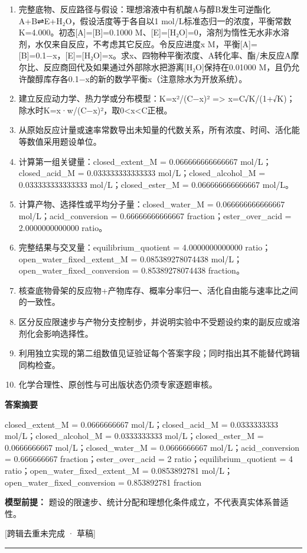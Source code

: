 \documentclass[UTF8,11pt,a4paper]{ctexart}
\begin{document}
\begin{enumerate}
\item 完整底物、反应路径与假设：理想溶液中有机酸A与醇B发生可逆酯化A+B⇌E+H₂O，假设活度等于各自以1 mol/L标准态归一的浓度，平衡常数K=4.000。初态[A]=[B]=0.1000 M、[E]=[H₂O]=0，溶剂为惰性无水非水溶剂，水仅来自反应，不考虑其它反应。令反应进度x M，平衡[A]=[B]=0.1−x，[E]=[H₂O]=x。求x、四物种平衡浓度、A转化率、酯/未反应A摩尔比、反应商回代及如果通过外部除水把游离[H₂O]保持在0.01000 M，且仍允许酸醇库存各0.1−x的新的数学平衡x（注意除水为开放系统）。
\item 建立反应动力学、热力学或分布模型：K=x²/(C−x)² => x=C√K/(1+√K)；除水时K=x·w/(C−x)²，取0<x<C正根。
\item 从原始反应计量或速率常数导出未知量的代数关系，所有浓度、时间、活化能等数值采用题设单位。
\item 计算第一组关键量：closed\_extent\_M = 0.066666666666667 mol/L；closed\_acid\_M = 0.033333333333333 mol/L；closed\_alcohol\_M = 0.033333333333333 mol/L；closed\_ester\_M = 0.066666666666667 mol/L。
\item 计算产物、选择性或平均分子量：closed\_water\_M = 0.066666666666667 mol/L；acid\_conversion = 0.66666666666667 fraction；ester\_over\_acid = 2.0000000000000 ratio。
\item 完整结果与交叉量：equilibrium\_quotient = 4.0000000000000 ratio；open\_water\_fixed\_extent\_M = 0.085389278074438 mol/L；open\_water\_fixed\_conversion = 0.85389278074438 fraction。
\item 核查底物骨架的反应物+产物库存、概率分率归一、活化自由能与速率比之间的一致性。
\item 区分反应限速步与产物分支控制步，并说明实验中不受题设约束的副反应或溶剂化会影响选择性。
\item 利用独立实现的第二组数值见证验证每个答案字段；同时指出其不能替代跨辑同构检查。
\item 化学合理性、原创性与可出版状态仍须专家逐题审核。
\end{enumerate}
\noindent\textbf{答案摘要}\par
closed\_extent\_M = 0.0666666667 mol/L；closed\_acid\_M = 0.0333333333 mol/L；closed\_alcohol\_M = 0.0333333333 mol/L；closed\_ester\_M = 0.0666666667 mol/L；closed\_water\_M = 0.0666666667 mol/L；acid\_conversion = 0.666666667 fraction；ester\_over\_acid = 2 ratio；equilibrium\_quotient = 4 ratio；open\_water\_fixed\_extent\_M = 0.0853892781 mol/L；open\_water\_fixed\_conversion = 0.853892781 fraction\par
\noindent\textbf{模型前提：}
题设的限速步、统计分配和理想化条件成立，不代表真实体系普适性。\par
\noindent\textcolor{red!65!black}{[跨辑去重未完成 · 草稿]} \par
\medskip\hrule\medskip
{}
\end{document}
